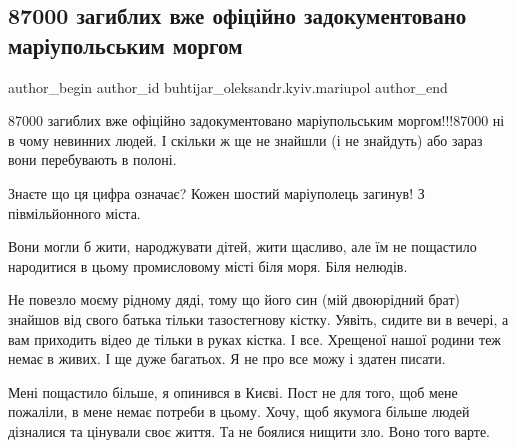  
 
 
 
 

\subsection{87000 загиблих вже офіційно задокументовано маріупольським моргом}
\label{sec:29_08_2022.fb.buhtijar_oleksandr.kyiv.mariupol.1.87000_zagiblikh_vzhe}

\ifcmt
 author_begin
   author_id buhtijar_oleksandr.kyiv.mariupol
 author_end
\fi

87000 загиблих вже офіційно задокументовано маріупольським моргом!!!87000 ні в
чому невинних людей. І скільки ж ще не знайшли (і не знайдуть) або зараз вони
перебувають в полоні.

Знаєте що ця цифра означає? Кожен шостий маріуполець загинув! З півмільйонного
міста.

Вони могли б жити, народжувати дітей, жити щасливо, але їм не пощастило
народитися в цьому промисловому місті біля моря. Біля нелюдів. 

Не повезло моєму рідному дяді, тому що його син (мій двоюрідний брат) знайшов
від свого батька тільки тазостегнову кістку. Уявіть, сидите ви в вечері, а вам
приходить відео де тільки в руках кістка. І все. Хрещеної нашої родини теж
немає в живих. І ще дуже багатьох. Я не про все можу і здатен писати.

Мені пощастило більше, я опинився в Києві. Пост не для того, щоб мене пожаліли,
в мене немає потреби в цьому. Хочу, щоб якумога більше людей дізналися та
цінували своє життя. Та не боялися нищити зло. Воно того варте.
